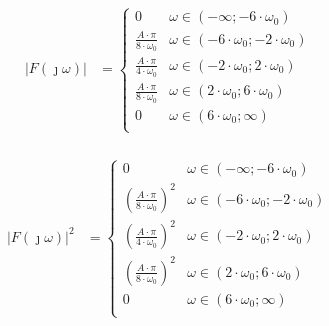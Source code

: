\begin{task}
\begin{figure}[H]
\begin{tikzpicture}
	\end{tikzpicture}  
\end{figure}

\begin{align*}
\left|F(\jmath \omega)\right| &= \begin{cases}
0 & \omega \in \left( -\infty; -6 \cdot \omega_0 \right) \\
\frac{A \cdot \pi}{8 \cdot \omega_0} & \omega \in \left(-6 \cdot \omega_0; -2 \cdot \omega_0 \right) \\
\frac{A \cdot \pi}{4 \cdot \omega_0} & \omega \in \left(-2 \cdot \omega_0; 2 \cdot \omega_0 \right) \\
\frac{A \cdot \pi}{8 \cdot \omega_0} & \omega \in \left(2 \cdot \omega_0; 6 \cdot \omega_0 \right) \\
0 & \omega \in \left(6 \cdot \omega_0; \infty \right) \\
\end{cases}\\
\end{align*}


\begin{align*}
\left|F(\jmath \omega)\right|^2 &= \begin{cases}
0 & \omega \in \left( -\infty; -6 \cdot \omega_0 \right) \\
\left(\frac{A \cdot \pi}{8 \cdot \omega_0}\right)^2 & \omega \in \left(-6 \cdot \omega_0; -2 \cdot \omega_0 \right) \\
\left(\frac{A \cdot \pi}{4 \cdot \omega_0}\right)^2 & \omega \in \left(-2 \cdot \omega_0; 2 \cdot \omega_0 \right) \\
\left(\frac{A \cdot \pi}{8 \cdot \omega_0}\right)^2 & \omega \in \left(2 \cdot \omega_0; 6 \cdot \omega_0 \right) \\
0 & \omega \in \left(6 \cdot \omega_0; \infty \right) \\
\end{cases}\\
\end{align*}



\end{task}
